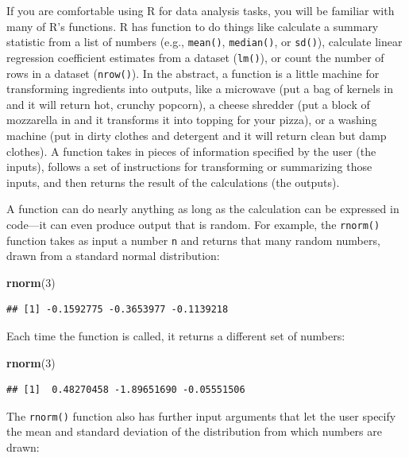 \documentclass[
]{book}
\newenvironment{Shaded}{\begin{snugshade}}{\end{snugshade}}
\newcommand{\DecValTok}[1]{\textcolor[rgb]{0.00,0.00,0.81}{#1}}
\newcommand{\FunctionTok}[1]{\textcolor[rgb]{0.13,0.29,0.53}{\textbf{#1}}}
\newcommand{\NormalTok}[1]{#1}
\begin{document}
If you are comfortable using R for data analysis tasks, you will be familiar with many of R's functions.
R has function to do things like calculate a summary statistic from a list of numbers (e.g., \texttt{mean()}, \texttt{median()}, or \texttt{sd()}), calculate linear regression coefficient estimates from a dataset (\texttt{lm()}), or count the number of rows in a dataset (\texttt{nrow()}).
In the abstract, a function is a little machine for transforming ingredients into outputs, like a microwave (put a bag of kernels in and it will return hot, crunchy popcorn), a cheese shredder (put a block of mozzarella in and it transforms it into topping for your pizza), or a washing machine (put in dirty clothes and detergent and it will return clean but damp clothes).
A function takes in pieces of information specified by the user (the inputs), follows a set of instructions for transforming or summarizing those inputs, and then returns the result of the calculations (the outputs).

A function can do nearly anything as long as the calculation can be expressed in code---it can even produce output that is random.
For example, the \texttt{rnorm()} function takes as input a number \texttt{n} and returns that many random numbers, drawn from a standard normal distribution:

\begin{Shaded}
\begin{Highlighting}[]
\FunctionTok{rnorm}\NormalTok{(}\DecValTok{3}\NormalTok{)}
\end{Highlighting}
\end{Shaded}

\begin{verbatim}
## [1] -0.1592775 -0.3653977 -0.1139218
\end{verbatim}

Each time the function is called, it returns a different set of numbers:

\begin{Shaded}
\begin{Highlighting}[]
\FunctionTok{rnorm}\NormalTok{(}\DecValTok{3}\NormalTok{)}
\end{Highlighting}
\end{Shaded}

\begin{verbatim}
## [1]  0.48270458 -1.89651690 -0.05551506
\end{verbatim}

The \texttt{rnorm()} function also has further input arguments that let the user specify the mean and standard deviation of the distribution from which numbers are drawn:
\end{document}
